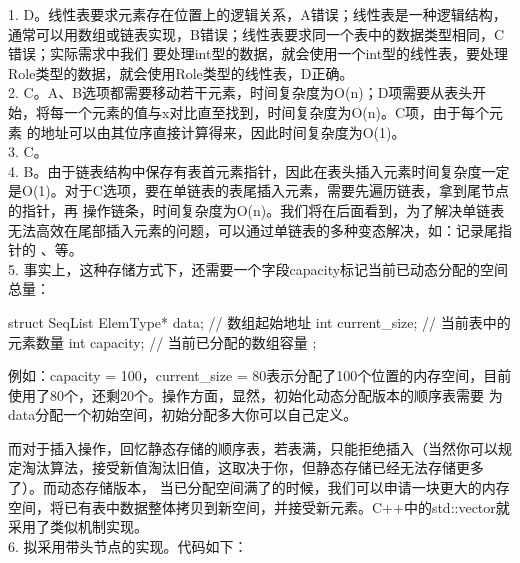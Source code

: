 %
%
1. D。线性表要求元素存在位置上的逻辑关系，A错误；线性表是一种逻辑结构，通常可以用数组或链表实现，B错误；线性表要求同一个表中的数据类型相同，C错误；实际需求中我们
要处理int型的数据，就会使用一个int型的线性表，要处理Role类型的数据，就会使用Role类型的线性表，D正确。\\

2. C。A、B选项都需要移动若干元素，时间复杂度为O(n)；D项需要从表头开始，将每一个元素的值与x对比直至找到，时间复杂度为O(n)。C项，由于每个元素
的地址可以由其位序直接计算得来，因此时间复杂度为O(1)。\\

3. C。\\

4. B。由于链表结构中保存有表首元素指针，因此在表头插入元素时间复杂度一定是O(1)。对于C选项，要在单链表的表尾插入元素，需要先遍历链表，拿到尾节点的指针，再
操作链条，时间复杂度为O(n)。我们将在后面看到，为了解决单链表无法高效在尾部插入元素的问题，可以通过单链表的多种变态解决，如：记录尾指针的
、等。\\

5. 事实上，这种存储方式下，还需要一个字段capacity标记当前已动态分配的空间总量：
\begin{cppcode}
    struct SeqList {
        ElemType* data;     // 数组起始地址
        int current_size;  // 当前表中的元素数量
        int capacity;      // 当前已分配的数组容量
    };
\end{cppcode}
例如：capacity = 100，current\_size = 80表示分配了100个位置的内存空间，目前使用了80个，还剩20个。操作方面，显然，初始化动态分配版本的顺序表需要
为data分配一个初始空间，初始分配多大你可以自己定义。

而对于插入操作，回忆静态存储的顺序表，若表满，只能拒绝插入（当然你可以规定淘汰算法，接受新值淘汰旧值，这取决于你，但静态存储已经无法存储更多了）。而动态存储版本，
当已分配空间满了的时候，我们可以申请一块更大的内存空间，将已有表中数据整体拷贝到新空间，并接受新元素。C++中的std::vector就采用了类似机制实现。\\

6. 拟采用带头节点的实现。代码如下：

